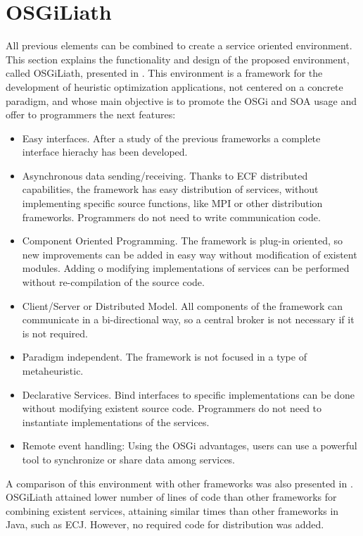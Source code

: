 \documentclass{sig-alternate}
\begin{document}
\section{OSGiLiath}
\label{sec:osgiliath}
All previous elements can be combined to create a service oriented environment. This section explains the functionality and design of the proposed environment, called OSGiLiath, presented in \cite{OSGILIATHNICSO}. This environment is a  framework for the development of heuristic optimization applications, not centered on a concrete paradigm, and whose main objective is to promote the OSGi and SOA usage and offer to programmers the next features:

\begin{itemize}
\item Easy interfaces. After a study of the previous frameworks a complete interface hierachy has been developed.
\item Asynchronous data sending/receiving. Thanks to ECF distributed capabilities, the framework has easy distribution of services, without implementing specific source functions, like MPI or other distribution frameworks. Programmers do not need to write communication code. 
\item Component Oriented Programming. The framework is plug-in oriented, so new improvements can be added in easy way without modification of existent modules. Adding o modifying implementations of services can be performed without re-compilation of the source code.
\item Client/Server or Distributed Model. All components of the framework can communicate in a bi-directional way, so a central broker is not necessary if it is not required.
\item Paradigm independent. The framework is not focused in a type of metaheuristic.
\item Declarative Services. Bind interfaces to specific implementations can be done without modifying existent source code. Programmers do not need to instantiate implementations of the services.
\item Remote event handling: Using the OSGi advantages, users can use a powerful tool to synchronize or share data among services.
\end{itemize}

A comparison of this environment with other frameworks was also presented in \cite{OSGILIATH}. OSGiLiath attained lower number of lines of code than other frameworks for combining existent services, attaining similar times than other frameworks in Java, such as ECJ. However, no required code for distribution was added.
\end{document}
